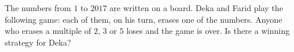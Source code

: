 \documentclass[varwidth]{standalone}
\begin{document}
    The numbers from $1$ to $2017$ are written on a board. Deka and Farid play the following game: each of them, on his turn, erases one of the numbers. Anyone who erases a multiple of $2$, $3$ or $5$ loses and the game is over. Is there a winning strategy for Deka?
\end{document}

